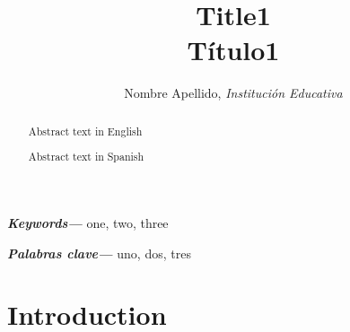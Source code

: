 \documentclass[utf8, twoside,]{article}
\providecommand{\keywords}[1]
{
  \small	
  \textbf{\textit{Keywords---}} #1
}
\providecommand{\pclave}[1]
{
  \small	
  \textbf{\textit{Palabras clave---}} #1
}
\begin{document}
\begin{otherlanguage}{american}


\title{Title1\\ \medskip %
Título1}
\author{Nombre Apellido, \it{Institución Educativa}}
\date{} %

\begin{singlespace}



\maketitle %


\def\abstractname{{Abstract}}


\begin{abstract}
   \vspace{-0.2cm} %
  
Abstract text in English
  
\end{abstract}


\def\abstractname{{Resumen}}


\begin{abstract}
      \vspace{-0.2cm} %
      
Abstract text in Spanish
   
\end{abstract}


\keywords{one, two, three}


\pclave{uno, dos, tres}



\end{singlespace}

\pagebreak


\section{Introduction}


\end{otherlanguage}
\end{document}
